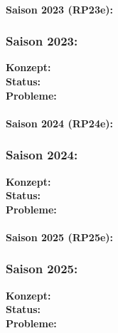 
\paragraph{Saison 2023 (RP23e):} 

\subsubsection{Saison 2023: }
\textbf{Konzept:}  \\
\textbf{Status:}  \\
\textbf{Probleme:} 



\paragraph{Saison 2024 (RP24e):} 

\subsubsection{Saison 2024: }
\textbf{Konzept:}  \\
\textbf{Status:}  \\
\textbf{Probleme:} 



\paragraph{Saison 2025 (RP25e):} 

\subsubsection{Saison 2025: }
\textbf{Konzept:}  \\
\textbf{Status:}  \\
\textbf{Probleme:} 